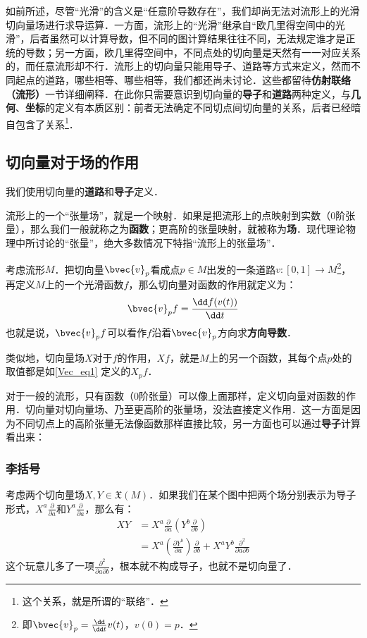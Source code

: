 如前所述，尽管“光滑”的含义是“任意阶导数存在”，我们却尚无法对流形上的光滑切向量场进行求导运算．一方面，流形上的“光滑”继承自“欧几里得空间中的光滑”，后者虽然可以计算导数，但不同的图计算结果往往不同，无法规定谁才是正统的导数；另一方面，欧几里得空间中，不同点处的切向量是天然有一一对应关系的，而任意流形却不行．流形上的切向量只能用导子、道路等方式来定义，然而不同起点的道路，哪些相等、哪些相等，我们都还尚未讨论．这些都留待\textbf{仿射联络（流形）}一节详细阐释．在此你只需要意识到切向量的\textbf{导子}和\textbf{道路}两种定义，与\textbf{几何}、\textbf{坐标}的定义有本质区别：前者无法确定不同切点间切向量的关系，后者已经暗自包含了关系\footnote{这个关系，就是所谓的“联络”．}．


\subsection{切向量对于场的作用}
我们使用切向量的\textbf{道路}和\textbf{导子}定义．

流形上的一个“张量场”，就是一个映射．如果是把流形上的点映射到实数（0阶张量），那么我们一般就称之为\textbf{函数}；更高阶的张量映射，就被称为\textbf{场}．现代理论物理中所讨论的“张量”，绝大多数情况下特指“流形上的张量场”．

考虑流形$M$．把切向量$\bvec{v}_p$看成点$p\in M$出发的一条道路$v:[0, 1]\to M$\footnote{即$\bvec{v}_p=\frac{\dd}{\dd t}v(t)$，$v(0)=p$．}，再定义$M$上的一个光滑函数$f$，那么切向量对函数的作用就定义为：
\begin{equation}\label{Vec_eq1}
\bvec{v}_pf=\frac{\dd f(v(t))}{\dd t}
\end{equation}
也就是说，$\bvec{v}_pf$可以看作$f$沿着$\bvec{v}_p$方向求\textbf{方向导数}．

类似地，切向量场$X$对于$f$的作用，$Xf$，就是$M$上的另一个函数，其每个点$p$处的取值都是如\autoref{Vec_eq1} 定义的$X_p f$．

对于一般的流形，只有函数（0阶张量）可以像上面那样，定义切向量对函数的作用．切向量对切向量场、乃至更高阶的张量场，没法直接定义作用．这一方面是因为不同切点上的高阶张量无法像函数那样直接比较，另一方面也可以通过\textbf{导子}计算看出来：

\subsubsection{李括号}

考虑两个切向量场$X, Y\in\mathfrak{X}(M)$．如果我们在某个图中把两个场分别表示为导子形式，$X^a\frac{\partial}{\partial a}$和$Y^a\frac{\partial}{\partial a}$，那么有：
\begin{equation}
\begin{aligned}
XY&=X^a\frac{\partial}{\partial a}(Y^b\frac{\partial}{\partial b})\\
&=X^a(\frac{\partial Y^b}{\partial a})\frac{\partial}{\partial b}+X^aY^b\frac{\partial^2}{\partial a\partial b}
\end{aligned}
\end{equation}
这个玩意儿多了一项$\frac{\partial^2}{\partial a\partial b}$，根本就不构成导子，也就不是切向量了．

